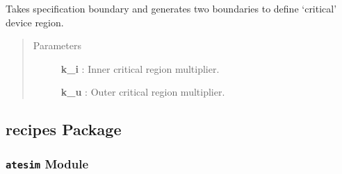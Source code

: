 \documentclass[letterpaper,10pt,english]{sphinxmanual}
\begin{document}
\begin{fulllineitems}

\begin{fulllineitems}
\label{qikify.models:qikify.models.specs.Specs.genCriticalRegion}
Takes specification boundary and generates two boundaries to define `critical' device 
region.
\begin{quote}\begin{description}
\item[{Parameters }] \leavevmode
\textbf{k\_i} : Inner critical region multiplier.

\textbf{k\_u} : Outer critical region multiplier.

\end{description}\end{quote}

\end{fulllineitems}


\end{fulllineitems}



\subsection{recipes Package}
\label{qikify.recipes::doc}\label{qikify.recipes:recipes-package}

\subsubsection{\texttt{atesim} Module}
\label{qikify.recipes:atesim-module}\label{qikify.recipes:module-qikify.recipes.atesim}
\end{document}
